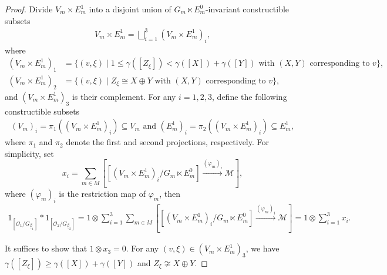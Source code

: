 \documentclass[12pt]{amsart}
\theoremstyle{definition}
\numberwithin{equation}{section}
\begin{document}
\begin{proof}
    Divide $ V_m \times E_m^1 $ into a disjoint union of $ G_m \ltimes E_m^0 $-invariant constructible subsets
    \begin{align*}
        V_m \times E_m^1 = \bigsqcup_{i=1}^3 (V_m \times E_m^1)_i,
    \end{align*}
    where
    \begin{align*}
        (V_m \times E_m^1)_1 &= \{(v,\xi)\mid  1 \leqslant \gamma([Z_{\xi}]) < \gamma([X])+\gamma([Y]) \text{ with } (X,Y) \text{ corresponding to } v \}, \\
        (V_m \times E_m^1)_2 &= \{(v,\xi)\mid  Z_{\xi} \cong X \oplus Y \text{ with } (X,Y) \text{ corresponding to } v \},
    \end{align*}
    and $ (V_m \times E_m^1)_3 $ is their complement. 
    For any $ i=1,2,3 $, define the following constructible subsets
    \begin{align*}
        (V_m)_i = \pi_1((V_m \times E_m^1)_i) \subseteq 
        V_m\text{ and } (E_m^1)_i = \pi_2((V_m \times E_m^1)_i) \subseteq E_m^1,
    \end{align*}
    where $ \pi_1 $ and $ \pi_2 $ denote the first and second projections, respectively. 
    For simplicity, set
    \[x_i = \sum_{m \in M} [[(V_m \times E_m^1)_i/G_m \ltimes E_m^0] \xrightarrow{(\varphi_m)_i} \mathcal{M}], \]
    where $ (\varphi_m)_i $ is the restriction map of $ \varphi_m $, then
    \begin{align*}
        1_{[\mathcal{O}_1/G_{\underline{\beta}_1}]} * 1_{[\mathcal{O}_2/G_{\underline{\beta}_2}]} = 1 \otimes \sum_{i=1}^3\sum_{m \in M} [[(V_m \times E_m^1)_i/G_m \ltimes E_m^0] \xrightarrow{(\varphi_m)_i} \mathcal{M}] = 1 \otimes \sum_{i=1}^3 x_i.
    \end{align*}
    
    It suffices to show that $ 1 \otimes x_3 = 0  $. 
    For any $ (v, \xi) \in  (V_m \times E_m^1)_3 $, we have $ \gamma([Z_{\xi}]) \geqslant \gamma([X])+\gamma([Y]) $ and $  Z_{\xi}  \not\cong X \oplus Y $. 
         

\end{proof}
\end{document}
